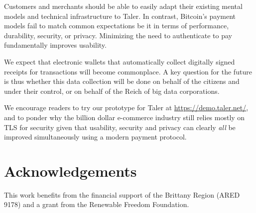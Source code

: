 \documentclass{IEEEtran}
\begin{document}
Customers and merchants should be able to easily adapt their existing
mental models and technical infrastructure to Taler.  In contrast,
Bitcoin's payment models fail to match common expectations be it in
terms of performance, durability, security, or privacy.  Minimizing
the need to authenticate to pay fundamentally improves usability.

We expect that electronic wallets that automatically collect digitally
signed receipts for transactions will become commonplace.  A key
question for the future is thus whether this data collection will be
done on behalf of the citizens and under their control, or on behalf
of the Reich of big data corporations.

We encourage readers to try our prototype for Taler
at \url{https://demo.taler.net/}, and to ponder why the billion dollar
e-commerce industry still relies mostly on TLS for security given
that usability, security and privacy can clearly {\em all} be improved
simultaneously using a modern payment protocol.


\section*{Acknowledgements}

This work benefits from the financial support of the Brittany Region
(ARED 9178) and a grant from the Renewable Freedom Foundation.




\appendix
\end{document}
